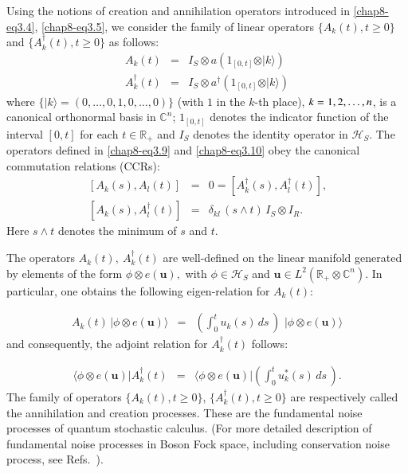 Using the notions of creation and annihilation operators introduced in \eqref{chap8-eq3.4}, \eqref{chap8-eq3.5}, we consider the family of linear operators  
$\{A_k(t), t\geq 0\}$ and  $\{A^\dag_k(t), t\geq 0\}$ as follows: 
\begin{eqnarray}
A_k(t)&=&I_S \otimes a \left (1_{[0,t]}  \otimes \vert k\rangle \right ) \label{chap8-eq3.9} \\
A^\dagger_k(t) &=& I_S \otimes a^{\dagger} \left (1_{[0,t]}  \otimes \vert k\rangle \right )  \label{chap8-eq3.10} 
\end{eqnarray}
where $\{\vert k\rangle = (0, \ldots, 0, 1,0,\ldots,0)\}$ (with $1$ in the $k$-th place), $k=1,2,\break\ldots, n$, is  a canonical orthonormal basis in $\mathbb{C}^n $;   $1_{[0,t]}$ denotes the indicator function of the interval $[0,t]$ for each $t\in\mathbb{R}_+$ and $I_S$  denotes the identity operator in $\mathcal{H}_S$. The operators defined in \eqref{chap8-eq3.9} and \eqref{chap8-eq3.10} obey the canonical commutation relations (CCRs): 
\begin{eqnarray}
\, [A_k(s),A_l(t)]&=&0=[A^\dag_k(s),A^\dag_l(t)], \label{chap8-eq3.11} \\   
\, [A_k (s),A^\dag_l(t)]&=&\delta_{kl}\, (s \wedge t)\, I_S\otimes I_R. \label{chap8-eq3.12}
\end{eqnarray}
Here $s\wedge t$ denotes the minimum of $s$ and $t$. 

The operators $A_k(t),\ A^\dag_k(t)$ are well-defined on the linear manifold generated by elements of the form $\phi 
\otimes e (\mathbf{u}),$ with $\phi \in \mathcal{H}_S$ and $\mathbf{u} \in L^2(\mathbb{R}_+\otimes \mathbb{C}^n)$. In particular, one obtains the following eigen-relation for $A_k(t)$: 

{\fontsize{9}{11}\selectfont
\begin{eqnarray} 
A_k(t)\,  \vert \phi \otimes e(\mathbf{u})\rangle &=& \left(\int_{0}^{t} u_k(s)\, ds\, \right)\, \,\vert\phi \otimes e(\mathbf{u})\rangle \label{chap8-eq3.13}
\end{eqnarray}}
and consequently, the adjoint relation for $A^\dag_k(t)$ follows: 

{\fontsize{9}{11}\selectfont
\begin{eqnarray} 
\langle \phi \otimes e(\mathbf{u})  \vert A^\dag_k(t) &=& \langle \phi \otimes e(\mathbf{u})  \vert \left(\int_{0}^{t} u^*_k(s)\, ds\, \right). \label{chap8-eq3.14}
\end{eqnarray}}
The family of operators $\{A_k(t), t\geq 0\}$, $\{A^\dag_k(t), t\geq 0\}$ are respectively called the annihilation and creation processes. These are the fundamental noise processes of quantum stochastic calculus. (For more detailed description of fundamental noise processes in Boson Fock space, including conservation noise process, see Refs.~\cite{chap8-key7, chap8-key8}).  

